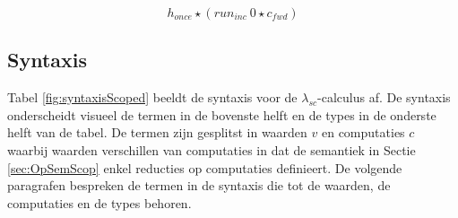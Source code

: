 \begin{equation} \label{eq:runEx}
    h_{once} \star (run_{inc} \: 0 \star c_{fwd})
\end{equation}



\subsection{Syntaxis}
Tabel \ref{fig:syntaxisScoped} beeldt de syntaxis voor de $\lambda_{sc}$-calculus af. De syntaxis onderscheidt visueel de termen in de bovenste helft en de types in de onderste helft van de tabel. De termen zijn gesplitst in waarden $v$ en computaties $c$ waarbij waarden verschillen van computaties in dat de semantiek in Sectie \ref{sec:OpSemScop} enkel reducties op computaties definieert. De volgende paragrafen bespreken de termen in de syntaxis die tot de waarden, de computaties en de types behoren.

